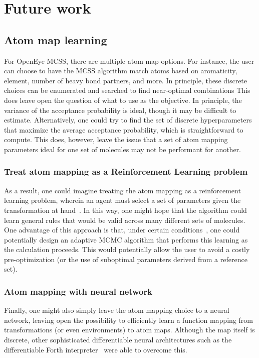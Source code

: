 \section{Future work}
%
\subsection{Atom map learning}
For OpenEye MCSS, there are multiple atom map options.
%
For instance, the user can choose to have the MCSS algorithm match atoms based on aromaticity, element, number of heavy bond partners, and more.
%
In principle, these discrete choices can be enumerated and searched to find near-optimal combinations
%
This does leave open the question of what to use as the objective.
%
In principle, the variance of the acceptance probability is ideal, though it may be difficult to estimate.
%
Alternatively, one could try to find the set of discrete hyperparameters that maximize the average acceptance probability, which is straightforward to compute.
%
This does, however, leave the issue that a set of atom mapping parameters ideal for one set of molecules may not be performant for another.
%
\subsubsection{Treat atom mapping as a Reinforcement Learning problem}
%
As a result, one could imagine treating the atom mapping as a reinforcement learning problem, wherein an agent must select a set of parameters given the transformation at hand~\cite{Sutton1988, Watkins1992}.
%
In this way, one might hope that the algorithm could learn general rules that would be valid across many different sets of molecules.
%
One advantage of this approach is that, under certain conditions~\cite{Andrieu2005, Andrieu2007, Andrieu2008}, one could potentially design an adaptive MCMC algorithm that performs this learning as the calculation proceeds.
%
This would potentially allow the user to avoid a costly pre-optimization (or the use of suboptimal parameters derived from a reference set).
%
\subsubsection{Atom mapping with neural network}
%
Finally, one might also simply leave the atom mapping choice to a neural network, leaving open the possibility to efficiently learn a function mapping from transformations (or even environments) to atom maps.
%
Although the map itself is discrete, other sophisticated differentiable neural architectures such as the differentiable Forth interpreter~\cite{bosnjak17} were able to overcome this.
%
